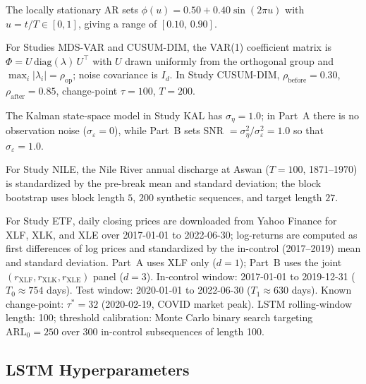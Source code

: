 \documentclass[bj,authoryear]{imsart}
\theoremstyle{plain}
\theoremstyle{definition}
\begin{document}
The locally stationary AR sets $\phi(u) = 0.50 + 0.40\sin(2\pi u)$ with
$u = t/T \in [0,1]$, giving a range of $[0.10,\, 0.90]$.

For Studies MDS-VAR and CUSUM-DIM, the VAR(1) coefficient matrix is
$\Phi = U\,\mathrm{diag}(\lambda)\,U^\top$ with $U$ drawn uniformly from the
orthogonal group and $\max_i|\lambda_i| = \rho_{\mathrm{op}}$; noise covariance
is $I_d$.  In Study CUSUM-DIM, $\rho_{\mathrm{before}}=0.30$, $\rho_{\mathrm{after}}=0.85$,
change-point $\tau=100$, $T=200$.

The Kalman state-space model in Study KAL has $\sigma_\eta = 1.0$; in Part~A
there is no observation noise ($\sigma_\varepsilon = 0$), while Part~B sets
SNR $= \sigma_\eta^2/\sigma_\varepsilon^2 = 1.0$ so that $\sigma_\varepsilon = 1.0$.

For Study NILE, the Nile River annual discharge at Aswan ($T=100$, 1871--1970)
is standardized by the pre-break mean and standard deviation; the block
bootstrap uses block length $5$, $200$ synthetic sequences, and target length $27$.

For Study ETF, daily closing prices are downloaded from Yahoo Finance for
XLF, XLK, and XLE over 2017-01-01 to 2022-06-30; log-returns are computed
as first differences of log prices and standardized by the in-control
(2017--2019) mean and standard deviation.  Part~A uses XLF only ($d=1$);
Part~B uses the joint $(r_{\mathrm{XLF}}, r_{\mathrm{XLK}}, r_{\mathrm{XLE}})$
panel ($d=3$).  In-control window: 2017-01-01 to 2019-12-31 ($T_0\approx 754$ days).
Test window: 2020-01-01 to 2022-06-30 ($T_1\approx 630$ days).
Known change-point: $\tau^*=32$ (2020-02-19, COVID market peak).
LSTM rolling-window length: 100; threshold calibration: Monte Carlo binary
search targeting $\mathrm{ARL}_0=250$ over 300 in-control subsequences of
length 100.

\subsection{LSTM Hyperparameters}
\end{document}
